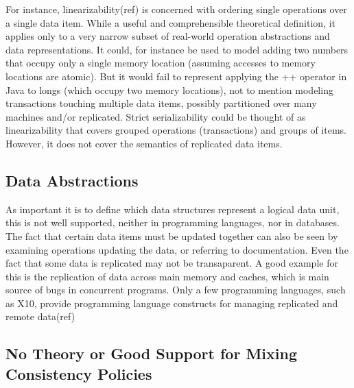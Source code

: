 For instance, linearizability(ref) is concerned with ordering single
operations over a single data item. While a useful and comprehensible theoretical
definition, it applies only to a very narrow subset of real-world operation
abstractions and data representations. It could, for instance be used to model adding
two numbers that occupy only a single memory location (assuming accesses to
memory locations are atomic). But it would fail to represent applying the ++
operator in Java to longs (which occupy two memory locations), not to mention
modeling transactions touching multiple data items, possibly partitioned over many
machines and/or replicated. Strict serializability could be thought of as
linearizability that covers grouped operations (transactions) and groups of
items. However, it does not cover the semantics of replicated data items.\\


\subsection{Data Abstractions}
As important it is to define which data structures represent a logical data
unit, this is not well supported, neither in programming languages, nor in
databases. The fact that certain data items must be updated together can also be
seen by examining operations updating the data, or referring to documentation.
Even the fact that some data is replicated may not be transaparent. A good
example for this is the replication of data across main memory and caches, which
is main source of bugs in concurrent programs. Only a few programming languages,
such as X10, provide programming language constructs for managing replicated and
remote data(ref)




\subsection{No Theory or Good Support for Mixing Consistency Policies}

